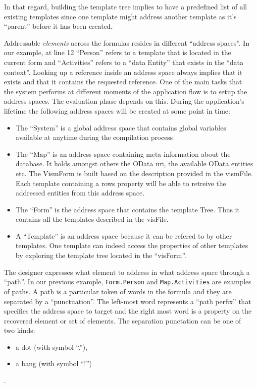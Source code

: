 In that regard, building the template tree implies to have a predefined list of all existing templates since one template might address another template as it's ``parent'' before it has been created.

Addressable \emph{elements} across the formulas resides in different ``address spaces''. In our example, at line 12 ``Person'' refers to a template that is located in the current form and ``Activities'' refers to a ``data Entity'' that exists in the ``data context''. Looking up a reference inside an address space always implies that it exists and that it contains the requested reference. One of the main tasks that the system performs at different moments of the application flow is to setup the address spaces. The evaluation phase depends on this. During the application's lifetime the following address spaces will be created at some point in time:
\begin{itemize}
    \item The ``System'' is a global address space that contains global variables available at anytime during the compilation process
    \item The ``Map'' is an address space containing meta-information about the database. It holds amongst others the OData uri, the available OData entities etc. The VismForm is built based on the description provided in the vismFile. Each template containing a rows property will be able to retreive the addressed entities from this address space.
    \item The ``Form'' is the address space that contains the template Tree. Thus it contains all the templates described in the visFile.
    \item A ``Template'' is an address space because it can be refered to by other templates. One template can indeed access the properties of other templates by exploring the template tree located in the ``visForm''.
\end{itemize}

The designer expresses what element to address in what address space through a ``path''. In our previous example, \texttt{Form.Person} and \texttt{Map.Activities} are examples of paths. A path is a particular token of words in the formula and they are separated by a ``punctuation''. The left-most word represents a ``path perfix'' that specifies the address space to target and the right most word is a property on the recovered element or set of elements. The separation punctation can be one of two kinds:
\begin{itemize}
    \item a dot (with symbol ``.''),
    \item a bang (with symbol ``!'')
\end{itemize}.

